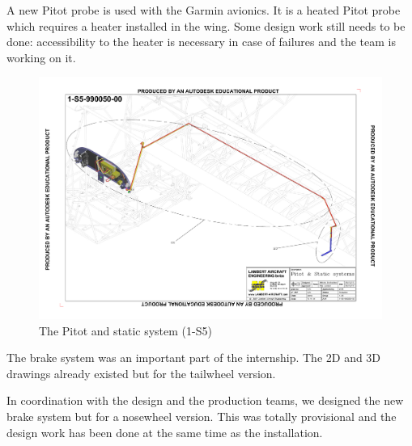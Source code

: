 \documentclass[11pt,a4paper]{article}
\begin{document}
\bigskip

A new Pitot probe is used with the Garmin avionics. It is a heated Pitot probe which requires a heater installed in the wing. Some design work still needs to be done: accessibility to the heater is necessary in case of failures and the team is working on it.

\bigskip

\begin{figure}[ht!]
	\begin{center}
		\includegraphics[width=15cm,trim = 1.5cm 1.5cm 1.5cm 1.5cm, clip]{pics/PIC017.pdf}
		\caption{The Pitot and static system (1-S5)}
		\label{fig:PIC017}
	\end{center}
\end{figure}

\newpage

The brake system was an important part of the internship. The 2D and 3D drawings already existed but for the tailwheel version.

\bigskip

In coordination with the design and the production teams, we designed the new brake system but for a nosewheel version. This was totally provisional and the design work has been done at the same time as the installation.
\end{document}
